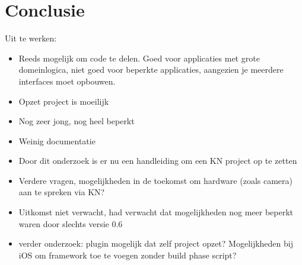 
\chapter{Conclusie}
\label{ch:conclusie}


Uit te werken:
\begin{itemize}
	\item Reeds mogelijk om code te delen. Goed voor applicaties met grote domeinlogica, niet goed voor beperkte applicaties, aangezien je meerdere interfaces moet opbouwen.
	\item Opzet project is moeilijk
	\item Nog zeer jong, nog heel beperkt
	\item Weinig documentatie
	\item Door dit onderzoek is er nu een handleiding om een KN project op te zetten
	\item Verdere vragen, mogelijkheden in de toekomst om hardware (zoals camera) aan te spreken via KN?
	\item Uitkomst niet verwacht, had verwacht dat mogelijkheden nog meer beperkt waren door slechts versie 0.6
	\item verder onderzoek: plugin mogelijk dat zelf project opzet? Mogelijkheden bij iOS om framework toe te voegen zonder build phase script?
\end{itemize}
\lipsum[76-80]

